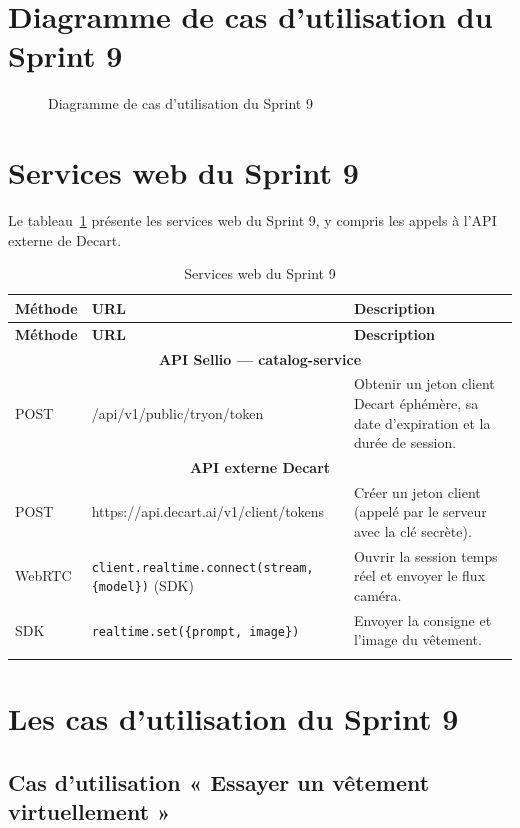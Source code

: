 \section{Diagramme de cas d'utilisation du Sprint 9}
\begin{figure}[H]
    \centering
    \caption{Diagramme de cas d'utilisation du Sprint 9}
    \label{fig:cu-sprint9}
\end{figure}

\section{Services web du Sprint 9}
Le tableau~\ref{tab:ws-sprint9} présente les services web du Sprint 9, y compris les appels à l'API externe de Decart.
\renewcommand{\arraystretch}{1.15}
\setlength{\tabcolsep}{4pt}
\begin{longtable}{|p{1.7cm}|p{6.6cm}|p{6.2cm}|}
\hline
\textbf{Méthode} & \textbf{URL} & \textbf{Description} \\
\hline
\endfirsthead
\hline
\textbf{Méthode} & \textbf{URL} & \textbf{Description} \\
\hline
\endhead
\multicolumn{3}{|c|}{\textbf{API Sellio --- catalog-service}} \\
\hline
POST & /api/v1/public/tryon/token & Obtenir un jeton client Decart éphémère, sa date d'expiration et la durée de session. \\
\hline
\multicolumn{3}{|c|}{\textbf{API externe Decart}} \\
\hline
POST & https://api.decart.ai/v1/client/tokens & Créer un jeton client (appelé par le serveur avec la clé secrète). \\
\hline
WebRTC & \texttt{client.realtime.connect(stream, \{model\})} (SDK) & Ouvrir la session temps réel et envoyer le flux caméra. \\
\hline
SDK & \texttt{realtime.set(\{prompt, image\})} & Envoyer la consigne et l'image du vêtement. \\
\hline
\caption{Services web du Sprint 9}
\label{tab:ws-sprint9}
\end{longtable}

\section{Les cas d'utilisation du Sprint 9}
\subsection{Cas d'utilisation « Essayer un vêtement virtuellement »}
